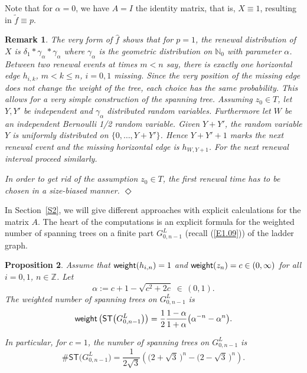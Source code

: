 \documentclass[11pt]{article}
\providecommand{\1}{\mathBB{1}}
\newcommand{\N}{{\mathbb{N}}}
\newcommand{\Z}{{\mathbb{Z}}}
\def\hatf{\widehat f}
\newcommand{\equ}[1]{(\ref{#1})}
\def\SPT{\mathsf{ST}}
\newtheorem{proposition}{Proposition}[section]
\newtheorem{uremark}[proposition]{Remark}
\newenvironment{remark}{\begin{uremark}\em}{\hfill$\Diamond$\end{uremark}}
\newcommand{\weight}{\mathop{\mbox{\sf weight}}}
\begin{document}
Note that for $\alpha=0$, we have $A=I$ the identity matrix, that is, $X\equiv1$, resulting in $\tilde f\equiv p$.

\begin{remark}
\label{R1}
The very form of $\hatf$ shows that for $p=1$, the renewal distribution of $X$ is $\delta_1\ast\gamma_\alpha\ast\gamma_\alpha$ where $\gamma_\alpha$ is the geometric distribution on $\N_0$ with parameter $\alpha$. Between two renewal events at times $m<n$ say, there is exactly one horizontal edge $h_{i,k}$, $m<k\leq n$, $i=0,1$ missing. Since the very position of the missing edge does not change the weight of the tree, each choice has the same probability. This allows for a very simple construction of the spanning tree. Assuming $z_0\in T$, let $Y,Y'$ be independent and $\gamma_\alpha$ distributed random variables. Furthermore let $W$ be an independent Bernoulli 1/2 random variable. Given $Y+Y'$, the random variable $Y$ is uniformly distributed on $\{0,\ldots,Y+Y'\}$. Hence $Y+Y'+1$ marks the next renewal event and the missing horizontal edge is $h_{W,Y+1}$. For the next renewal interval proceed similarly.

In order to get rid of the assumption $z_0\in T$, the first renewal time has to be chosen in a size-biased manner.
\end{remark}

In Section~\ref{S2}, we will give different approaches with explicit calculations for the matrix $A$. The heart of the computations is an explicit formula for the weighted number of spanning trees on a finite part $G^L_{0,n-1}$ (recall \equ{E1.09}) of the ladder graph.

\begin{proposition}
\label{P1.3}
Assume that $\weight(h_{i,n})=1$ and $\weight(z_n)=c\in(0,\infty)$ for all $i=0,1$, $n\in\Z$. Let
\begin{equation}
\label{E1.15}
\alpha:=c+1-\sqrt{c^2+2c}\;\in\,(0,1).
\end{equation}
The weighted number of spanning trees on $G^L_{0,n-1}$ is
\begin{equation}
\label{E1.16}
\weight\big(\SPT\big(G^L_{0,n-1}\big)\big)=\frac12\frac{1-\alpha}{1+\alpha}\big(\alpha^{-n}-\alpha^{n}\big).
\end{equation}

In particular, for $c=1$, the number of spanning trees on $G^L_{0,n-1}$ is
$$\#\SPT\big(G^L_{0,n-1}\big)=\frac{1}{2\sqrt{3}}\left(\big(2+\sqrt{3}\,\big)^n-\big(2-\sqrt{3}\,\big)^n\right).$$
\end{proposition}
\end{document}
